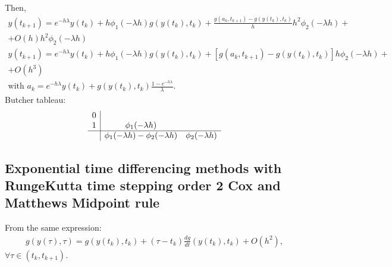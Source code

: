 \documentclass[letterpaper,10pt,english]{jupyterBook}
\begin{document}
\sphinxAtStartPar
Then,
\begin{equation*}
\begin{split}
y(t_{k+1}) = e^{-h \lambda} y(t_k) +
  h \phi_1 (-\lambda h) g(y(t_k), t_k) +
  \frac{g(a_k, t_{k+1}) - g(y(t_k), t_k)}{h} h^2 \phi_2 (-\lambda h) + \\
  + O(h)h^2 \phi_2 (-\lambda h) \\
  y(t_{k+1}) = e^{-h \lambda} y(t_k) +
  h \phi_1 (-\lambda h) g(y(t_k), t_k) +
  \left[g(a_k, t_{k+1}) - g(y(t_k), t_k) \right] h \phi_2 (-\lambda h) + \\
  + O(h^3) \\
  \text{with } a_k = e^{-h \lambda}y(t_k) + g(y(t_k), t_k) \frac{1-e^{-h\lambda}}{\lambda}.
\end{split}
\end{equation*}
\sphinxAtStartPar
Butcher tableau:
\begin{equation*}
\begin{split}
\begin{array}
{c|cc}
0\\
1 & \phi_1(-\lambda h)\\
\hline
& \phi_1 (-\lambda h) - \phi_2 (-\lambda h) & \phi_2 (-\lambda h)
\end{array}
\end{split}
\end{equation*}

\subsection{Exponential time differencing methods with Runge\sphinxhyphen{}Kutta time stepping \sphinxhyphen{} order 2 \sphinxhyphen{} Cox and Matthews \sphinxhyphen{} Midpoint rule}
\label{\detokenize{appendix:exponential-time-differencing-methods-with-runge-kutta-time-stepping-order-2-cox-and-matthews-midpoint-rule}}
\sphinxAtStartPar
From the same expression:
\begin{equation*}
\begin{split}
    g(y(\tau), \tau) = g(y(t_k), t_k) + (\tau - t_k) \frac{dg}{dt} (y(t_k), t_k) + O(h^2),
\end{split}
\end{equation*}
\sphinxAtStartPar
\(\forall \tau \in (t_k, t_{k+1}).\)
\end{document}
